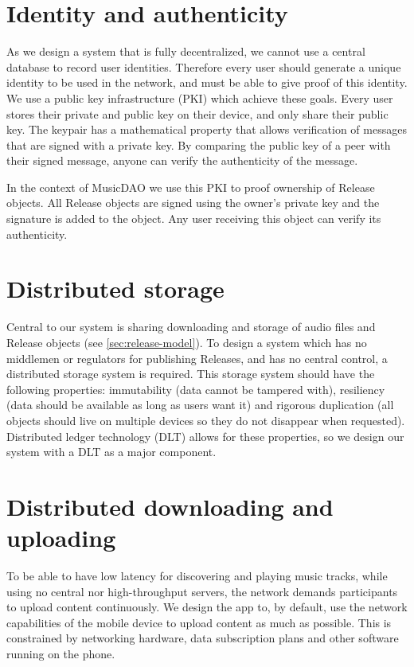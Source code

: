 \section{Identity and authenticity}
\label{sec:pki-design}
As we design a system that is fully decentralized, we cannot use a central database to record user identities. Therefore every user should generate a unique identity to be used in the network, and must be able to give proof of this identity. We use a public key infrastructure (PKI) which achieve these goals. Every user stores their private and public key on their device, and only share their public key. The keypair has a mathematical property that allows verification of messages that are signed with a private key. By comparing the public key of a peer with their signed message, anyone can verify the authenticity of the message.

In the context of MusicDAO we use this PKI to proof ownership of Release objects. All Release objects are signed using the owner's private key and the signature is added to the object. Any user receiving this object can verify its authenticity.

\section{Distributed storage}
Central to our system is sharing downloading and storage of audio files and Release objects (see \ref{sec:release-model}). To design a system which has no middlemen or regulators for publishing Releases, and has no central control, a distributed storage system is required. This storage system should have the following properties: immutability (data cannot be tampered with), resiliency (data should be available as long as users want it) and rigorous duplication (all objects should live on multiple devices so they do not disappear when requested). Distributed ledger technology (DLT) allows for these properties, so we design our system with a DLT as a major component.

\section{Distributed downloading and uploading}
To be able to have low latency for discovering and playing music tracks, while using no central nor high-throughput servers, the network demands participants to upload content continuously. We design the app to, by default, use the network capabilities of the mobile device to upload content as much as possible. This is constrained by networking hardware, data subscription plans and other software running on the phone.

